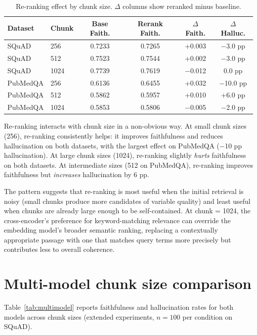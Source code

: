 \begin{table}[!htb]
\centering
\caption{Re-ranking effect by chunk size. $\Delta$ columns show
reranked minus baseline.}
\label{tab:reranker_chunk}
\small
\begin{tabular}{llcccc}
\toprule
Dataset & Chunk & Base Faith. & Rerank Faith. & $\Delta$ Faith. & $\Delta$ Halluc. \\
\midrule
SQuAD    & 256  & 0.7233 & 0.7265 & +0.003 & $-$3.0 pp \\
SQuAD    & 512  & 0.7523 & 0.7544 & +0.002 & $-$3.0 pp \\
SQuAD    & 1024 & 0.7739 & 0.7619 & $-$0.012 & 0.0 pp \\
\midrule
PubMedQA & 256  & 0.6136 & 0.6455 & +0.032 & $-$10.0 pp \\
PubMedQA & 512  & 0.5862 & 0.5957 & +0.010 & +6.0 pp \\
PubMedQA & 1024 & 0.5853 & 0.5806 & $-$0.005 & $-$2.0 pp \\
\bottomrule
\end{tabular}
\end{table}

Re-ranking interacts with chunk size in a non-obvious way. At small chunk
sizes (256), re-ranking consistently helps: it improves faithfulness and
reduces hallucination on both datasets, with the largest effect on
PubMedQA ($-$10 pp hallucination). At large chunk sizes (1024),
re-ranking slightly \emph{hurts} faithfulness on both datasets. At
intermediate sizes (512 on PubMedQA), re-ranking improves faithfulness
but \emph{increases} hallucination by 6 pp.

The pattern suggests that re-ranking is most useful when the initial
retrieval is noisy (small chunks produce more candidates of variable
quality) and least useful when chunks are already large enough to be
self-contained. At chunk = 1024, the cross-encoder's preference for
keyword-matching relevance can override the embedding model's broader
semantic ranking, replacing a contextually appropriate passage with one
that matches query terms more precisely but contributes less to overall
coherence.

\FloatBarrier
\section{Multi-model chunk size comparison}
\label{app:multimodel}

Table~\ref{tab:multimodel} reports faithfulness and hallucination rates
for both models across chunk sizes (extended experiments, $n = 100$ per
condition on SQuAD).

